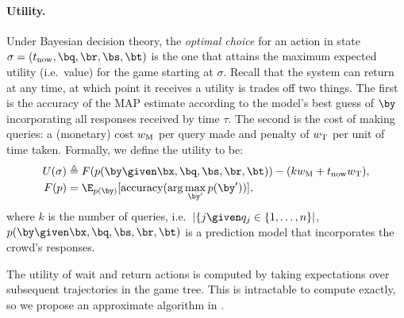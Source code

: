 \paragraph{Utility.}
Under Bayesian decision theory, the \emph{optimal choice} for an action in state $\sigma = (\now, \bq, \br, \bs, \bt)$ is the one that attains the maximum expected utility (i.e.\ value) for the game starting at $\sigma$.
Recall that the system can return at any time, at which point it receives a utility is trades off two things.
The first is the accuracy of the MAP estimate according to the model's best guess of $\by$ incorporating all responses received by time $\tau$.
The second is the cost of making queries: a (monetary) cost $w_\text{M}$ per query made and penalty of $w_\text{T}$ per unit of time taken.
Formally, we define the utility to be:
\begin{align}
  \label{eqn:utility}
  U(\sigma) &\eqdef F(p(\by \given \bx, \bq, \bs, \br, \bt)) - (k \weightmoney + \now \weighttime), \\
  F(p) &= \E_{p(\by)}[\accuracy(\arg\max_{\by'} p(\by'))],
\end{align}
where $k$ is the number of queries, i.e.\ $|\{j \given q_j \in \{1, \ldots, n\}|$,
$p(\by \given \bx, \bq, \bs, \br, \bt)$ is a prediction model that incorporates the crowd's responses.

The utility of wait and return actions is computed by taking expectations over subsequent trajectories in the game tree. 
This is intractable to compute exactly, so we propose an approximate algorithm in .

%
%

